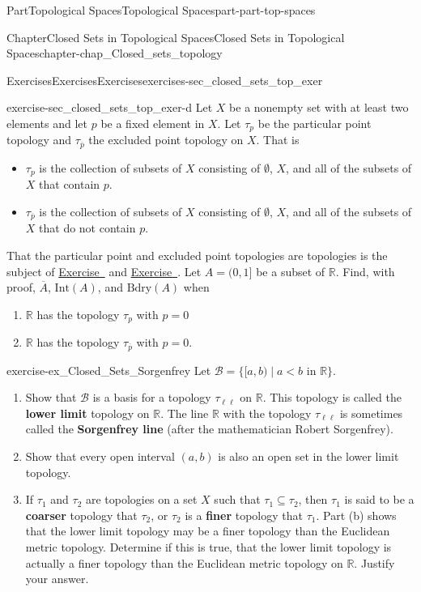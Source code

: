 \documentclass[oneside,10pt,]{book}
\newcommand{\xreffont}{\relax}
\newcommand{\terminology}[1]{\textbf{#1}}
\numberwithin{equation}{chapter}
\newcommand{\R}{\mathbb{R}}
\newcommand{\B}{\mathcal{B}}
\newcommand{\Int}{\text{Int}}
\newcommand{\Bdry}{\text{Bdry}}
\newcommand{\lt}{<}
\begin{document}
\begin{partptx}{Part}{Topological Spaces}{}{Topological Spaces}{}{}{part-part-top-spaces}
\begin{chapterptx}{Chapter}{Closed Sets in Topological Spaces}{}{Closed Sets in Topological Spaces}{}{}{chapter-chap_Closed_sets_topology}
\begin{exercises-section}{Exercises}{Exercises}{}{Exercises}{}{}{exercises-sec_closed_sets_top_exer}
\begin{divisionexercise}{4}{}{}{exercise-sec_closed_sets_top_exer-d}
Let \(X\) be a nonempty set with at least two elements and let \(p\) be a fixed element in \(X\). Let \(\tau_p\) be the particular point topology and \(\tau_{\overline{p}}\) the excluded point topology on \(X\). That is%
\begin{itemize}[label=\textbullet]
\item{}\(\tau_{p}\) is the collection of subsets of \(X\) consisting of \(\emptyset\), \(X\), and all of the subsets of \(X\) that contain \(p\).%
\item{}\(\tau_{\overline{p}}\) is the collection of subsets of \(X\) consisting of \(\emptyset\), \(X\), and all of the subsets of \(X\) that do not contain \(p\).%
\end{itemize}
That the particular point and excluded point topologies are topologies is the subject of \hyperlink{exercise-ex_particular_point_topology}{Exercise~{\xreffont 9}} and \hyperlink{exercise-ex_excluded_point_topology}{Exercise~{\xreffont 10}}. Let \(A = (0,1]\) be a subset of \(\R\). Find, with proof, \(\overline{A}\), \(\Int(A)\), and \(\Bdry(A)\) when%
\begin{enumerate}[font=\bfseries,label=(\alph*),ref=\alph*]%
\item{}\(\R\) has the topology \(\tau_{p}\) with \(p = 0\)%
\item{}\(\R\) has the topology \(\tau_{\overline{p}}\) with \(p = 0\).%
\end{enumerate}%
\end{divisionexercise}%
\begin{divisionexercise}{5}{}{}{exercise-ex_Closed_Sets_Sorgenfrey}%
%
%
Let \(\B = \{[a,b) \mid a \lt b \text{ in } \R\}\).%
\begin{enumerate}[font=\bfseries,label=(\alph*),ref=\alph*]%
\item{}Show that \(\B\) is a basis for a topology \(\tau_{\ell \ell}\) on \(\R\). This topology is called the \terminology{lower limit} topology on \(\R\). The line \(\R\) with the topology \(\tau_{\ell \ell}\) is sometimes called the \terminology{Sorgenfrey line} (after the mathematician Robert Sorgenfrey).%
\item{}Show that every open interval \((a,b)\) is also an open set in the lower limit topology.%
\item{}If \(\tau_1\) and \(\tau_2\) are topologies on a set \(X\) such that \(\tau_1 \subseteq \tau_2\), then \(\tau_1\) is said to be a \terminology{coarser} topology that \(\tau_2\), or \(\tau_2\) is a \terminology{finer} topology that \(\tau_1\). Part (b) shows that the lower limit topology may be a finer topology than the Euclidean metric topology. Determine if this is true, that the lower limit topology is actually a finer topology than the Euclidean metric topology on \(\R\). Justify your answer.%

\end{enumerate}
\end{divisionexercise}
\end{exercises-section}
\end{chapterptx}
\end{partptx}
\end{document}
